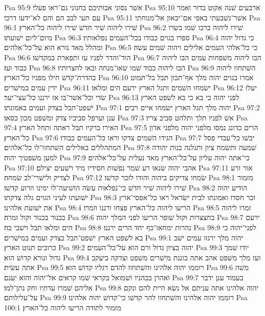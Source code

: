 Psa 95:9  אשׁר נסוני אבותיכם בחנוני גם־ראו פעלי׃
Psa 95:10  ארבעים שׁנה אקוט בדור ואמר עם תעי לבב הם והם לא־ידעו דרכי׃
Psa 95:11  אשׁר־נשׁבעתי באפי אם־יבאון אל־מנוחתי׃
Psa 96:1  שׁירו ליהוה שׁיר חדשׁ שׁירו ליהוה כל־הארץ׃
Psa 96:2  שׁירו ליהוה ברכו שׁמו בשׂרו מיום־ליום ישׁועתו׃
Psa 96:3  ספרו בגוים כבודו בכל־העמים נפלאותיו׃
Psa 96:4  כי גדול יהוה ומהלל מאד נורא הוא על־כל־אלהים׃
Psa 96:5  כי כל־אלהי העמים אלילים ויהוה שׁמים עשׂה׃
Psa 96:6  הוד־והדר לפניו עז ותפארת במקדשׁו׃
Psa 96:7  הבו ליהוה משׁפחות עמים הבו ליהוה כבוד ועז׃
Psa 96:8  הבו ליהוה כבוד שׁמו שׂאו־מנחה ובאו לחצרותיו׃
Psa 96:9  השׁתחוו ליהוה בהדרת־קדשׁ חילו מפניו כל־הארץ׃
Psa 96:10  אמרו בגוים יהוה מלך אף־תכון תבל בל־תמוט ידין עמים במישׁרים׃
Psa 96:11  ישׂמחו השׁמים ותגל הארץ ירעם הים ומלאו׃
Psa 96:12  יעלז שׂדי וכל־אשׁר־בו אז ירננו כל־עצי־יער׃
Psa 96:13  לפני יהוה כי בא כי בא לשׁפט הארץ ישׁפט־תבל בצדק ועמים באמונתו׃
Psa 97:1  יהוה מלך תגל הארץ ישׂמחו איים רבים׃
Psa 97:2  ענן וערפל סביביו צדק ומשׁפט מכון כסאו׃
Psa 97:3  אשׁ לפניו תלך ותלהט סביב צריו׃
Psa 97:4  האירו ברקיו תבל ראתה ותחל הארץ׃
Psa 97:5  הרים כדונג נמסו מלפני יהוה מלפני אדון כל־הארץ׃
Psa 97:6  הגידו השׁמים צדקו וראו כל־העמים כבודו׃
Psa 97:7  יבשׁו כל־עבדי פסל המתהללים באלילים השׁתחוו־לו כל־אלהים׃
Psa 97:8  שׁמעה ותשׂמח ציון ותגלנה בנות יהודה למען משׁפטיך יהוה׃
Psa 97:9  כי־אתה יהוה עליון על־כל־הארץ מאד נעלית על־כל־אלהים׃
Psa 97:10  אהבי יהוה שׂנאו רע שׁמר נפשׁות חסידיו מיד רשׁעים יצילם׃
Psa 97:11  אור זרע לצדיק ולישׁרי־לב שׂמחה׃
Psa 97:12  שׂמחו צדיקים ביהוה והודו לזכר קדשׁו׃
Psa 98:1  מזמור שׁירו ליהוה שׁיר חדשׁ כי־נפלאות עשׂה הושׁיעה־לו ימינו וזרוע קדשׁו׃
Psa 98:2  הודיע יהוה ישׁועתו לעיני הגוים גלה צדקתו׃
Psa 98:3  זכר חסדו ואמונתו לבית ישׂראל ראו כל־אפסי־ארץ את ישׁועת אלהינו׃
Psa 98:4  הריעו ליהוה כל־הארץ פצחו ורננו וזמרו׃
Psa 98:5  זמרו ליהוה בכנור בכנור וקול זמרה׃
Psa 98:6  בחצצרות וקול שׁופר הריעו לפני המלך יהוה׃
Psa 98:7  ירעם הים ומלאו תבל וישׁבי בה׃
Psa 98:8  נהרות ימחאו־כף יחד הרים ירננו׃
Psa 98:9  לפני־יהוה כי בא לשׁפט הארץ ישׁפט־תבל בצדק ועמים במישׁרים׃
Psa 99:1  יהוה מלך ירגזו עמים ישׁב כרובים תנוט הארץ׃
Psa 99:2  יהוה בציון גדול ורם הוא על־כל־העמים׃
Psa 99:3  יודו שׁמך גדול ונורא קדושׁ הוא׃
Psa 99:4  ועז מלך משׁפט אהב אתה כוננת מישׁרים משׁפט וצדקה ביעקב אתה עשׂית׃
Psa 99:5  רוממו יהוה אלהינו והשׁתחוו להדם רגליו קדושׁ הוא׃
Psa 99:6  משׁה ואהרן בכהניו ושׁמואל בקראי שׁמו קראים אל־יהוה והוא יענם׃
Psa 99:7  בעמוד ענן ידבר אליהם שׁמרו עדתיו וחק נתן־למו׃
Psa 99:8  יהוה אלהינו אתה עניתם אל נשׂא היית להם ונקם על־עלילותם׃
Psa 99:9  רוממו יהוה אלהינו והשׁתחוו להר קדשׁו כי־קדושׁ יהוה אלהינו׃
Psa 100:1  מזמור לתודה הריעו ליהוה כל־הארץ׃
